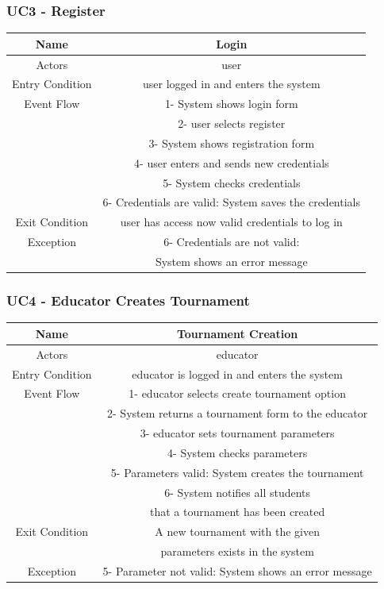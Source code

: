 \documentclass{article}
\begin{document}
\subsubsection*{UC3 - Register}

\begin{tabular*}{\linewidth}{@{\extracolsep{\fill}} cc }
    \hline
    Name & Login \\ 
    \hline
    Actors & user \\ 
    \hline
    Entry Condition & user logged in and enters the system \\ 
    \hline
    Event Flow & 1- System shows login form\\
               & 2- user selects register\\
               & 3- System shows registration form\\
               & 4- user enters and sends new credentials\\ 
               & 5- System checks credentials\\
               & 6- Credentials are valid: System saves the credentials\\ 
    \hline
    Exit Condition & user has access now valid credentials to log in\\ 
    \hline
    Exception & 6- Credentials are not valid:\\
              &   System shows an error message\\
    \hline
\end{tabular*}

\subsubsection*{UC4 - Educator Creates Tournament}

\begin{tabular*}{\linewidth}{@{\extracolsep{\fill}} cc }
    \hline
    Name & Tournament Creation \\ 
    \hline
    Actors & educator\\ 
    \hline
    Entry Condition & educator is logged in and enters the system \\ 
    \hline
    Event Flow & 1- educator selects create tournament option\\
               & 2- System returns a tournament form to the educator\\
               & 3- educator sets tournament parameters\\
               & 4- System checks parameters\\
               & 5- Parameters valid: System creates the tournament\\
               & 6- System notifies all students\\
               & that a tournament has been created\\
    \hline
    Exit Condition & A new tournament with the given\\
                   & parameters exists in the system\\
    \hline
    Exception & 5- Parameter not valid: System shows an error message\\
    \hline
\end{tabular*}
\end{document}
